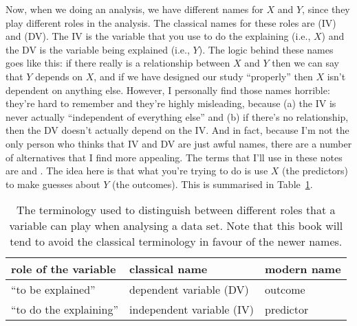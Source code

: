 Now, when we doing an analysis, we have different names for $X$ and $Y$, since they play different roles in the analysis. The classical names for these roles are  (IV) and  (DV). The IV is the variable that you use to do the explaining (i.e., $X$) and the DV is the variable being explained (i.e., $Y$). The logic behind these names goes like this: if there really is a relationship between $X$ and $Y$ then we can say that $Y$ depends on $X$, and if we have designed our study ``properly'' then $X$ isn't dependent on anything else. However, I personally find those names horrible: they're hard to remember and they're highly misleading, because (a) the IV is never actually ``independent of everything else'' and (b) if there's no relationship, then the DV doesn't actually depend on the IV. And in fact, because I'm not the only person who thinks that IV and DV are just awful names, there are a number of alternatives that I find more appealing. The terms that I'll use in these notes are  and . The idea here is that what you're trying to do is use $X$ (the predictors) to make guesses about $Y$ (the outcomes). This is summarised in Table~\ref{tab:ivdv}.

\begin{table}
\caption{The terminology used to distinguish between different roles that a variable can play when analysing a data set. Note that this book will tend to avoid the classical terminology in favour of the newer names.} \label{tab:ivdv} \tabcapsep
\begin{center}
\begin{tabular}{l|ll}
role of the variable & classical name & modern name  \\ \hline
``to be explained'' & dependent variable (DV) & outcome \\
``to do the explaining'' & independent variable (IV) & predictor \\ 
\end{tabular} 
\tabcapsep \HR
\end{center}
\end{table}


